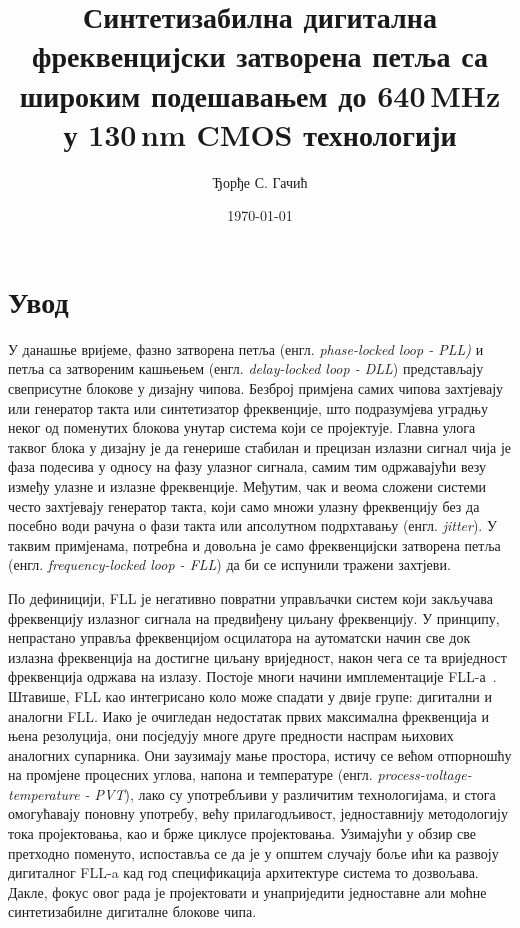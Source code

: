 \documentclass[master]{finthesis}
\title{Синтетизабилна дигитална фреквенцијски затворена петља са широким подешавањем до 640\texorpdfstring{\,}{ }MHz у 130\texorpdfstring{\,}{ }nm CMOS технологији}
\author{Ђорђе С. Гачић}
\date{\today}
\begin{document}
\maketitle

\tableofcontents

\makeabstract

\section{Увод}
У данашње вријеме, фазно затворена петља (енгл. \textit{phase-locked loop - PLL)} и петља са затвореним кашњењем (енгл. \textit{delay-locked loop - DLL}) представљају свеприсутне блокове у дизајну чипова. Безброј примјена самих чипова захтјевају или генератор такта или синтетизатор фреквенције, што подразумјева уградњу неког од поменутих блокова унутар система који се пројектује. Главна улога таквог блока у дизајну је да генерише стабилан и прецизан излазни сигнал чија је фаза подесива у односу на фазу улазног сигнала, самим тим одржавајући везу између улазне и излазне фреквенције. Међутим, чак и веома сложени системи често захтјевају генератор такта, који само множи улазну фреквенцију без да посебно води рачуна о фази такта или апсолутном подрхтавању (енгл. \textit{jitter}). У таквим примјенама, потребна и довољна је само фреквенцијски затворена петља (енгл. \textit{frequency-locked loop - FLL}) да би се испунили тражени захтјеви.

По дефиницији, FLL је негативно повратни управљачки систем који закључава фреквенцију излазног сигнала на предвиђену циљану фреквенцију. У принципу, непрастано управља фреквенцијом осцилатора на аутоматски начин све док излазна фреквенција на достигне циљану вриједност, након чега се та вриједност фреквенција одржава на излазу. Постоје многи начини имплементације FLL-а~\cite{Ali:9097205}. Штавише, FLL као интегрисано коло може спадати у двије групе: дигитални и аналогни FLL. Иако је очигледан недостатак првих максимална фреквенција и њена резолуција, они посједују многе друге предности наспрам њихових аналогних супарника. Они заузимају мање простора, истичу се већом отпорношћу на промјене процесних углова, напона и температуре (енгл. \textit{process-voltage-temperature - PVT}), лако су употребљиви у различитим технологијама, и стога омогућавају поновну употребу, већу прилагодљивост, једноставнију методологију тока пројектовања, као и брже циклусе пројектовања. Узимајући у обзир све претходно поменуто, испоставља се да је у општем случају боље ићи ка развоју дигиталног FLL-a кад год спецификација архитектуре система то дозвољава. Дакле, фокус овог рада је пројектовати и унаприједити једноставне али моћне синтетизабилне дигиталне блокове чипа.
\end{document}
